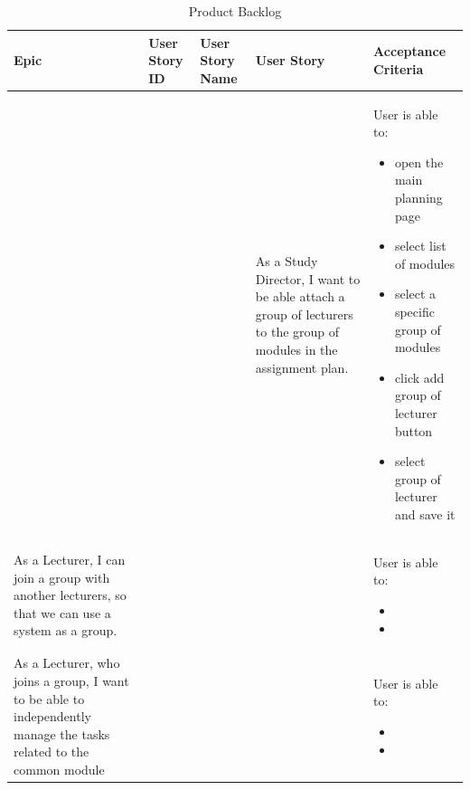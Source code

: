\documentclass{scrartcl}
\begin{document}
\begin{table}[H]
\begin{center}
\begin{tabular}{|p{4cm}|p{0.5cm} |p{3cm}|p{4cm}|p{4cm}|}\hline
\rowcolor{LightCyan}
 \textbf{Epic} &\textbf{ User Story ID} &\textbf{User Story Name} &\textbf{User Story}  & \textbf{Acceptance Criteria}  \\
\hline
&
&
&
 As a Study Director, I want to be able attach a group of lecturers to the group of modules in the assignment plan. &
 
   User is able to:            
\begin{itemize}
\item open the main planning page
\item select list of modules 
\item select a specific group of modules
\item click add group of lecturer button
\item select group of lecturer and save it


\end{itemize}                                                                 \\ \hline

 
 As a Lecturer, I can join a group with another lecturers, so that we can use a system as a group. &
 &
&
&
   User is able to:            
\begin{itemize}
\item
\item


\end{itemize}                                                                 \\ \hline


 
 As a Lecturer, who joins a group, I want to be able to independently manage the tasks related to the common module &
 &
&
&
   User is able to:            
\begin{itemize}
\item
\item


\end{itemize}                                                                 \\ \hline

 \end{tabular}
\end{center}
\caption{Product Backlog}
\label{table2}
\end{table}
\end{document}
